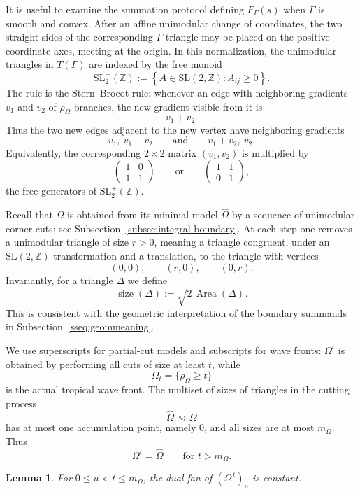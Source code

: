 \documentclass[a4paper,american,11pt]{amsart}
\theoremstyle{plain}
\newtheorem{lemma}[theorem]{Lemma}
\theoremstyle{definition}
\newcommand{\Z}{\mathbb Z}
\DeclareMathOperator{\Area}{Area}
\begin{document}
It is useful to examine the summation protocol defining \(F_\Gamma(s)\) when
\(\Gamma\) is smooth and convex.  After an affine unimodular change of
coordinates, the two straight sides of the corresponding \(\Gamma\)-triangle
may be placed on the positive coordinate axes, meeting at the origin.  In
this normalization, the unimodular triangles in \(T(\Gamma)\) are indexed by
the free monoid
\[
\mathrm{SL}_2^+(\Z)
:=
\left\{
A\in\mathrm{SL}(2,\Z): A_{ij}\ge0
\right\}.
\]
The rule is the Stern--Brocot rule: whenever an edge with neighboring
gradients \(v_1\) and \(v_2\) of \(\rho_\Omega\) branches, the new gradient
visible from it is
\[
v_1+v_2.
\]
Thus the two new edges adjacent to the new vertex have neighboring gradients
\[
v_1,\ v_1+v_2
\qquad\text{and}\qquad
v_1+v_2,\ v_2.
\]
Equivalently, the corresponding \(2\times2\) matrix \((v_1,v_2)\) is
multiplied by
\[
\begin{pmatrix}
1&0\\1&1
\end{pmatrix}
\qquad\text{or}\qquad
\begin{pmatrix}
1&1\\0&1
\end{pmatrix},
\]
the free generators of \(\mathrm{SL}_2^+(\Z)\).

Recall that \(\Omega\) is obtained from its minimal model \(\widehat\Omega\)
by a sequence of unimodular corner cuts; see
Subsection~\ref{subsec:integral-boundary}.  At each step one removes a
unimodular triangle of size \(r>0\), meaning a triangle congruent, under an
\(\mathrm{SL}(2,\Z)\) transformation and a translation, to the triangle with
vertices
\[
(0,0),\qquad (r,0),\qquad (0,r).
\]
Invariantly, for a triangle \(\Delta\) we define
\[
\operatorname{size}(\Delta):=\sqrt{2\,\Area(\Delta)}.
\]
This is consistent with the geometric interpretation of the boundary
summands in Subsection~\ref{sseq:geommeaning}.

We use superscripts for partial-cut models and subscripts for wave fronts:
\(\Omega^t\) is obtained by performing all cuts of size at least \(t\), while
\[
\Omega_t=\{\rho_\Omega\ge t\}
\]
is the actual tropical wave front.  The multiset of sizes of triangles in the
cutting process
\[
\widehat\Omega\rightsquigarrow\Omega
\]
has at most one accumulation point, namely \(0\), and all sizes are at most
\(m_\Omega\).  Thus
\[
\Omega^t=\widehat\Omega
\qquad\text{for } t>m_\Omega.
\]

\begin{lemma}
For \(0\le u<t\le m_\Omega\), the dual fan of \((\Omega^{\,t})_u\) is
constant.
\end{lemma}
\end{document}
